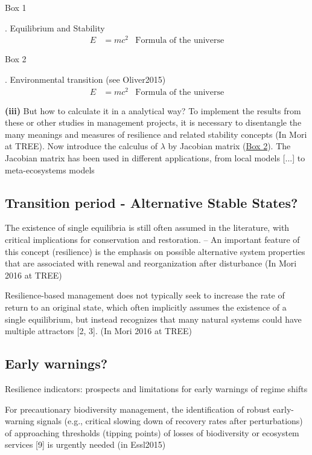 \begin{tcolorbox}
\hypertarget{box1}{Box 1}. Equilibrium and Stability
\begin{align}
E &= mc^2 & \text{Formula of the universe}
\end{align}
\end{tcolorbox}

\begin{tcolorbox}
\hypertarget{box2}{Box 2}. Environmental transition (see Oliver2015)
\begin{align}
E &= mc^2 & \text{Formula of the universe}
\end{align}
\end{tcolorbox}

\textbf{(iii)} But how to calculate it in a analytical way?
To implement the results from these or other studies in management projects, it is necessary to disentangle the many meanings and measures of resilience and related stability concepts (In Mori at TREE).
Now introduce the calculus of $\lambda$ by Jacobian matrix (\hyperlink{box2}{Box 2}).
The Jacobian matrix has been used in different applications, from local models [...] to meta-ecosystems models \citep{Gravel2016}

\subsection{Transition period - Alternative Stable States?}
The existence of single equilibria is still often assumed in the literature, with critical implications for conservation and restoration. -- An important feature of this concept (resilience) is the emphasis on possible alternative system properties that are associated with renewal and reorganization after disturbance (In Mori 2016 at TREE)

Resilience-based management does not typically seek to increase the rate of return to an original state, which often implicitly assumes the existence of a single equilibrium, but instead recognizes that many natural systems could have multiple attractors [2, 3]. (In Mori 2016 at TREE)

\subsection{Early warnings?}

Resilience indicators: prospects and limitations for early warnings of regime shifts

For precautionary biodiversity management, the identification of robust early-warning signals (e.g., critical slowing down of recovery rates after perturbations) of approaching thresholds (tipping points) of losses of biodiversity or ecosystem services [9] is urgently needed (in Essl2015)

